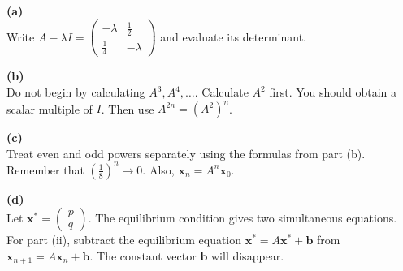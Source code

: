\begin{hint}
\textbf{(a)}\\
Write $A-\lambda I = \begin{pmatrix} -\lambda & \frac12\\[2mm] \frac14 & -\lambda \end{pmatrix}$ and evaluate its determinant.

\textbf{(b)}\\
Do not begin by calculating $A^3,A^4,\ldots$. Calculate $A^2$ first. You should obtain a scalar multiple of $I$. Then use $A^{2n}=(A^2)^n$.

\textbf{(c)}\\
Treat even and odd powers separately using the formulas from part (b). Remember that $\left(\frac18\right)^n\to0$. Also, $\mathbf{x}_n=A^n\mathbf{x}_0$.

\textbf{(d)}\\
Let $\mathbf{x}^* = \begin{pmatrix} p\\q \end{pmatrix}$. The equilibrium condition gives two simultaneous equations.
For part (ii), subtract the equilibrium equation $\mathbf{x}^*=A\mathbf{x}^*+\mathbf b$ from $\mathbf{x}_{n+1}=A\mathbf{x}_n+\mathbf b$. The constant vector $\mathbf b$ will disappear.
\end{hint}

